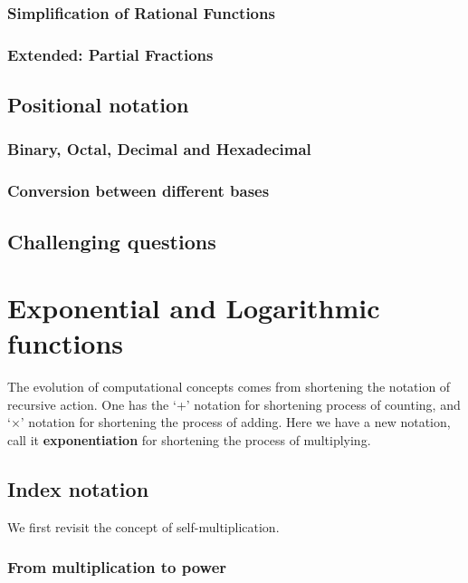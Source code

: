 \documentclass[12pt]{article}
\begin{document}
    \subsubsection*{Simplification of Rational Functions}

    \subsubsection*{Extended: Partial Fractions}

    \subsection{Positional notation}

    \subsubsection*{Binary, Octal, Decimal and Hexadecimal}

    \subsubsection*{Conversion between different bases}

    \subsection{Challenging questions}

    \newpage

    \section{Exponential and Logarithmic functions}

    The evolution of computational concepts comes from shortening the notation of recursive action. One has the `+' notation for shortening process of counting, and `$\times$' notation for shortening the process of adding. Here we have a new notation, call it \textbf{exponentiation} for shortening the process of multiplying.

    \subsection{Index notation}

    We first revisit the concept of self-multiplication.

    \subsubsection*{From multiplication to power}
\end{document}
